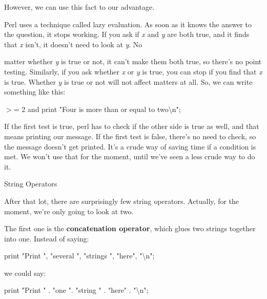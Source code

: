 \documentclass[a4paper,11pt]{book}
\begin{document}
\noindent However, we can use this fact to our advantage.

\noindent 

\noindent Perl uses a technique called lazy  evaluation. As soon as it knows the answer to the question, it stops working. If you ask if \textit{x }and \textit{y }are both true, and it finds that \textit{x }isn't, it doesn't need to look at \textit{y}. No

\noindent matter whether \textit{y }is true or not, it can't make them both true, so there's no point testing. Similarly, if you ask whether \textit{x }or \textit{y }is true, you can stop if you find that \textit{x }is true. Whether \textit{y }is true or not will not affect matters at all. So, we can write something like this:

\noindent 

\noindent 

 $>$= 2 and print "Four is more than or equal to two\textbackslash n";

\noindent 

\noindent If the first test is true, perl has to check if the other side is true as well, and that means printing our message. If the first test is false, there's no need to check, so the message doesn't get printed. It's a crude way of saving time if a condition is met. We won't use that for the moment, until we've seen a less crude way to do it.

\noindent 

\noindent String Operators

\noindent 

\noindent After that lot, there are surprisingly few string operators. Actually, for the moment, we're only going to look at two.

\noindent 

\noindent The first one is the \textbf{concatenation operator}, which glues two strings together into one. Instead of saying:

\noindent 

\noindent 

\noindent print "Print ", "several ", "strings ", "here", "\textbackslash n";

\noindent 

\noindent we could say:

\noindent 

\noindent 

\noindent print "Print " . "one ". "string " . "here" . "\textbackslash n";
\end{document}

